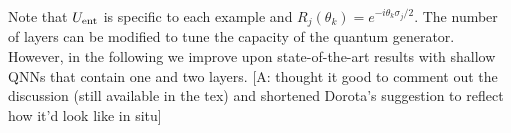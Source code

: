 \documentclass[twocolumn,preprintnumbers,superscriptaddress]{revtex4-2}
\newcommand{\commentCBP}[1]{{\color{red} {[C: #1]}}}
\newcommand{\commentAF}[1]{{\color{cyan} {[A: #1]}}}
\newcommand{\commentDMG}[1]{{\color{orange} {[D: #1]}}}
\begin{document}

Note that $U_{\rm ent}$ is specific to each example and $R_j(\theta_k) = e^{-i\theta_k \sigma_j /2}$. The number of layers can be modified to tune the capacity of the quantum generator. However, in the following we improve upon state-of-the-art results with shallow QNNs that contain one and two layers.
\commentAF{thought it good to comment out the discussion (still available in the tex) and shortened Dorota's suggestion to reflect how it'd look like in situ}
\end{document}
